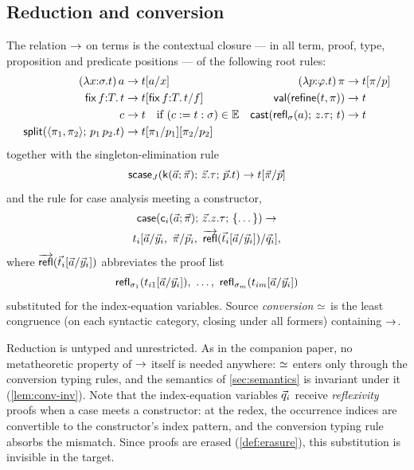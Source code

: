\subsection{Reduction and conversion}
\label{sec:calculus-red}

\begin{definition}[Reduction]
\label{def:source-red}
The relation $\rightarrow$ on terms is the contextual closure --- in all term,
proof, type, proposition and predicate positions --- of the following
root rules:
\begin{align*}
  (\lambda x{:}\sigma.t)\,a &\rightarrow t[a/x]
  & (\lambda p{:}\varphi.t)\,\pi &\rightarrow t[\pi/p]
  \\
  \mathsf{fix}\,f{:}T.\,t &\rightarrow t[\mathsf{fix}\,f{:}T.\,t/f]
  & \mathsf{val}(\mathsf{refine}(t,\pi)) &\rightarrow t
  \\
  c &\rightarrow t \quad \text{if } (c \mathrel{:=} t : \sigma) \in \mathbb{E}
  & \mathsf{cast}(\mathsf{refl}_\sigma(a);\,z.\tau;\,t) &\rightarrow t
  \\
  \mathsf{split}(\langle \pi_1, \pi_2 \rangle;\,p_1\,p_2.t) &\rightarrow
     t[\pi_1/p_1][\pi_2/p_2]
\end{align*}
together with the singleton-elimination rule
\[
  \mathsf{scase}_{J}(\mathsf{k}(\vec{a};\vec{\pi});\,\vec{z}.\tau;\,\vec{p}.t)
     \rightarrow t[\vec{\pi}/\vec{p}]
\]
and the rule for case analysis meeting a constructor,
\begin{multline*}
  \mathsf{case}(\mathsf{c}_i(\vec{a};\vec{\pi});\,\vec{z}.z.\tau;\,\{\dots\})
     \rightarrow\\
     t_i[\vec{a}/\vec{y}_i,\ \vec{\pi}/\vec{p}_i,\
        \overrightarrow{\mathsf{refl}}(\vec{t}_i[\vec{a}/\vec{y}_i])/\vec{q}_i],
\end{multline*}
where $\overrightarrow{\mathsf{refl}}(\vec{t}_i[\vec{a}/\vec{y}_i])$
abbreviates the proof list
\[
  \mathsf{refl}_{\sigma_1}(t_{i1}[\tup{a}/\tup{y}_i]),\ \dots,\
  \mathsf{refl}_{\sigma_m}(t_{im}[\tup{a}/\tup{y}_i])
\]
substituted for the index-equation variables.  Source \emph{conversion}
$\simeq$ is the least
congruence (on each syntactic category, closing under all formers)
containing $\rightarrow$.
\end{definition}

Reduction is untyped and unrestricted.  As in the companion paper, no
metatheoretic property of $\rightarrow$ itself is needed anywhere: $\simeq$
enters only through the conversion typing rules, and the semantics of
\cref{sec:semantics} is invariant under it (\cref{lem:conv-inv}).  Note
that the index-equation variables $\vec{q}_i$ receive
\emph{reflexivity} proofs when a case meets a constructor: at the redex,
the occurrence indices are convertible to the constructor's index
pattern, and the conversion typing rule absorbs the mismatch.  Since
proofs are erased (\cref{def:erasure}), this substitution is invisible
in the target.

